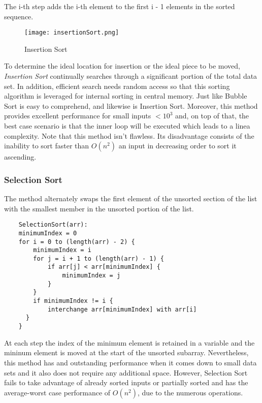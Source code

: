 \documentclass[11pt, letter paper]{article}
\begin{document}
        The i-th step adds the i-th element to the first i - 1 elements in the sorted sequence.

        \begin{figure}[h]
            \centering
            \texttt{[image: insertionSort.png]}
            \caption{Insertion Sort}
            \label{fig:my_label}
            \cite{Morin}
        \end{figure}

        To determine the ideal location for insertion or the ideal piece to be moved, \emph{Insertion Sort} continually searches through a significant portion of the total data set. In addition, efficient search needs random access so that this sorting algorithm is leveraged for internal sorting in central memory. Just like Bubble Sort is easy to comprehend, and likewise is Insertion Sort. Moreover, this method provides excellent performance for small inputs $< 10 ^ 3$ and, on top of that, the best case scenario is that the inner loop will be executed which leads to a linea complexity. Note that this method isn't flawless. Its disadvantage consists of the inability to sort faster than $O(n ^ 2)$ an input in decreasing order to sort it ascending.

        \subsubsection{Selection Sort}
        The method alternately swaps the first element of the unsorted section of the list with the smallest member in the unsorted portion of the list. \\

        \begin{lstlisting}
    SelectionSort(arr):
	minimumIndex = 0
	for i = 0 to (length(arr) - 2) {
		minimumIndex = i
		for j = i + 1 to (length(arr) - 1) {
			if arr[j] < arr[minimumIndex] {
				minimumIndex = j
            }
        }
		if minimumIndex != i {
			interchange arr[minimumIndex] with arr[i]
      }
    }
        \end{lstlisting}

         At each step the index of the minimum element is retained in a variable and the mininum element is moved at the start of the unsorted subarray. Nevertheless, this method has and outstanding performance when it comes down to small data sets and it also does not require any additional space. However, Selection Sort fails to take advantage of already sorted inputs or partially sorted and has the average-worst case performance of $O(n ^ 2)$, due to the numerous operations.
\end{document}
